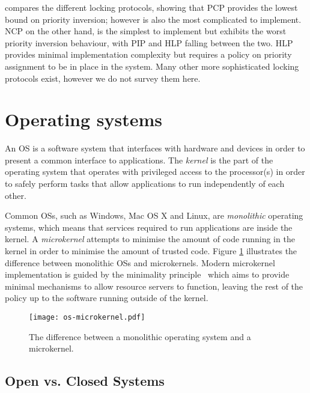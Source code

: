  compares the different locking protocols, showing that \gls{PCP} provides the lowest bound on priority inversion; however is also the most complicated to implement.
\gls{NCP} on the other hand, is the simplest to implement but exhibits the worst priority inversion behaviour, with \gls{PIP} and \gls{HLP} falling between the two.
\gls{HLP} provides minimal implementation complexity but requires a policy on priority assignment to be in place in the system.
Many other more sophisticated locking protocols exist, however we do not survey them here.


\section{Operating systems}

An \gls{OS} is a software system that interfaces with hardware and devices in order to present a common interface to applications.
The \emph{kernel} is the part of the operating system that operates with privileged access to the processor(s) in order to safely perform tasks that allow applications to run independently of each other.

Common \glspl{OS}, such as Windows, Mac OS X and Linux, are \emph{monolithic} operating systems, which means that services required to run applications are inside the kernel.
A \emph{microkernel} attempts to minimise the amount of code running in the kernel in order to minimise the amount of trusted code.
Figure \ref{fig:os-microkernel} illustrates the difference between monolithic \glspl{OS} and microkernels.
Modern microkernel implementation is guided by the minimality principle~\citep{Liedtke_95} which aims to provide minimal mechanisms to allow resource servers to function, leaving the rest of the policy up to the software running outside of the kernel.

\begin{figure}[h!tb]
	\begin{center}
		\leavevmode
		\texttt{[image: os-microkernel.pdf]}
		\caption{The difference between a monolithic operating system and a microkernel.}
		\label{fig:os-microkernel}
	\end{center}
\end{figure}


\subsection{Open vs. Closed Systems}

